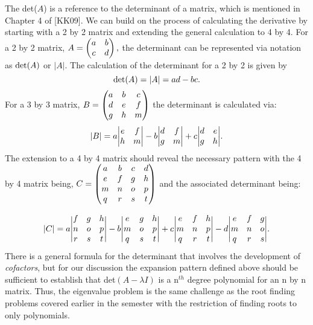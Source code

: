 \documentclass[twoside]{article}
\renewcommand{\cite}[1]{[#1]}
\def\ds{\displaystyle}
\begin{document}
The det($A$) is a reference to the determinant of a matrix, which is mentioned in Chapter 4 of \cite{KK09}. We can build on the process of calculating the derivative by starting with a 2 by 2 matrix and extending the general calculation to 4 by 4. For a 2 by 2 matrix, $\ds A = \begin{pmatrix} a & b \cr c & d\end{pmatrix},$
the determinant can be represented via notation as $\ds {\rm det}(A)$ or $\ds \vert A \vert$. The calculation of the determinant for a 2 by 2 is given by
$${\rm det}(A)=\vert A \vert = ad - bc.$$ 
For a 3 by 3 matrix, $\ds B = \begin{pmatrix} a & b & c \cr d & e & f \cr g & h & m\end{pmatrix}$ the determinant is calculated via:
$$\vert B \vert = a \biggr \vert \begin{matrix} e & f \cr h & m\end{matrix} \biggr \vert - b \biggr \vert \begin{matrix} d & f \cr g & m\end{matrix} \biggr \vert + c \biggr \vert \begin{matrix} d & e \cr g & h\end{matrix} \biggr \vert.$$
The extension to a 4 by 4 matrix should reveal the necessary pattern with the 4 by 4 matrix being,  $\ds C = \begin{pmatrix} a & b & c & d \cr  e & f & g & h \cr m & n & o & p \cr q & r & s & t \end{pmatrix}$ and the associated determinant being:

$$\vert C \vert = a \Biggr \vert \begin{matrix} f & g & h \cr n & o & p \cr r & s & t\end{matrix} \Biggr \vert - b \Biggr \vert \begin{matrix} e & g & h \cr m & o & p \cr q & s & t\end{matrix} \Biggr \vert + c \Biggr \vert \begin{matrix} e & f  & h \cr m & n & p  \cr q & r & t \end{matrix} \Biggr \vert - d \Biggr \vert \begin{matrix} e & f & g \cr m & n & o \cr q & r & s \end{matrix} \Biggr \vert .$$
There is a general formula for the determinant that involves the development of {\it cofactors}, but for our discussion the expansion pattern defined above should be sufficient to establish that det$\ds (A-\lambda I)$ is a n$^{th}$ degree polynomial for an n by n matrix. Thus, the eigenvalue problem is the same challenge as the root finding problems covered earlier in the semester with the restriction of finding roots to only polynomials. 
\end{document}
